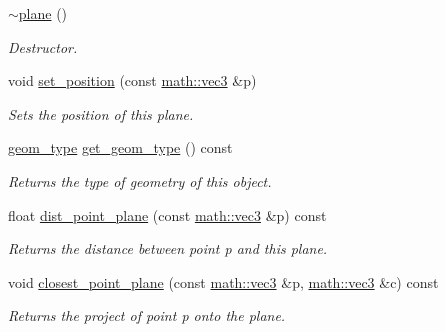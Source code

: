 \begin{DoxyCompactItemize}
\mbox{\label{classphysim_1_1geom_1_1plane_a89d7076c8639031ec4a0874ad8a4424c}} 
\hyperlink{classphysim_1_1geom_1_1plane_a89d7076c8639031ec4a0874ad8a4424c}{$\sim$plane} ()
\begin{DoxyCompactList}\small\item\em Destructor. \end{DoxyCompactList}\item 
void \hyperlink{classphysim_1_1geom_1_1plane_a6922a19aee04c7a7a975c03a3601951f}{set\+\_\+position} (const \hyperlink{structphysim_1_1math_1_1vec3}{math\+::vec3} \&p)
\begin{DoxyCompactList}\small\item\em Sets the position of this plane. \end{DoxyCompactList}\item 
\mbox{\label{classphysim_1_1geom_1_1plane_a8c266089d77272e4ce104aa1e64ba2ed}} 
\hyperlink{namespacephysim_1_1geom_a473d69ab4667a730784b37b67fa4b658}{geom\+\_\+type} \hyperlink{classphysim_1_1geom_1_1plane_a8c266089d77272e4ce104aa1e64ba2ed}{get\+\_\+geom\+\_\+type} () const
\begin{DoxyCompactList}\small\item\em Returns the type of geometry of this object. \end{DoxyCompactList}\item 
\mbox{\label{classphysim_1_1geom_1_1plane_ab8fb985af66d400aaa911514551557b9}} 
float \hyperlink{classphysim_1_1geom_1_1plane_ab8fb985af66d400aaa911514551557b9}{dist\+\_\+point\+\_\+plane} (const \hyperlink{structphysim_1_1math_1_1vec3}{math\+::vec3} \&p) const
\begin{DoxyCompactList}\small\item\em Returns the distance between point {\itshape p} and this plane. \end{DoxyCompactList}\item 
\mbox{\label{classphysim_1_1geom_1_1plane_acd1a7a2e83550025210d32de71c229de}} 
void \hyperlink{classphysim_1_1geom_1_1plane_acd1a7a2e83550025210d32de71c229de}{closest\+\_\+point\+\_\+plane} (const \hyperlink{structphysim_1_1math_1_1vec3}{math\+::vec3} \&p, \hyperlink{structphysim_1_1math_1_1vec3}{math\+::vec3} \&c) const
\begin{DoxyCompactList}\small\item\em Returns the project of point {\itshape p} onto the plane. \end{DoxyCompactList}\item 

\end{DoxyCompactItemize}
